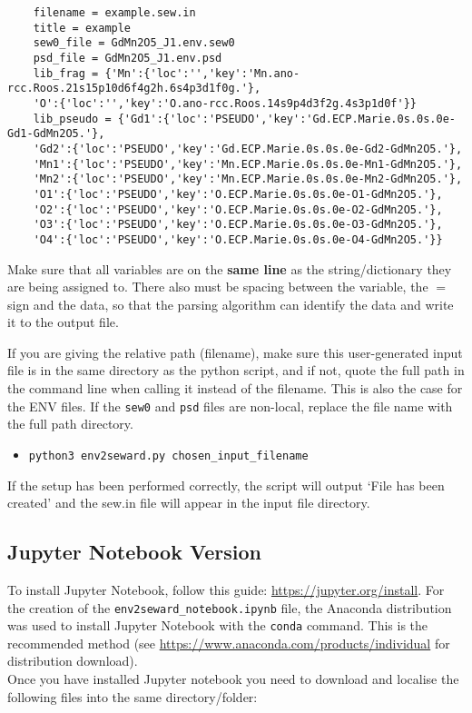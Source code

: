 \begin{lstlisting}
	filename = example.sew.in
	title = example
	sew0_file = GdMn2O5_J1.env.sew0
	psd_file = GdMn2O5_J1.env.psd
	lib_frag = {'Mn':{'loc':'','key':'Mn.ano-rcc.Roos.21s15p10d6f4g2h.6s4p3d1f0g.'},
	'O':{'loc':'','key':'O.ano-rcc.Roos.14s9p4d3f2g.4s3p1d0f'}}
	lib_pseudo = {'Gd1':{'loc':'PSEUDO','key':'Gd.ECP.Marie.0s.0s.0e-Gd1-GdMn2O5.'},
	'Gd2':{'loc':'PSEUDO','key':'Gd.ECP.Marie.0s.0s.0e-Gd2-GdMn2O5.'},
	'Mn1':{'loc':'PSEUDO','key':'Mn.ECP.Marie.0s.0s.0e-Mn1-GdMn2O5.'},
	'Mn2':{'loc':'PSEUDO','key':'Mn.ECP.Marie.0s.0s.0e-Mn2-GdMn2O5.'},
	'O1':{'loc':'PSEUDO','key':'O.ECP.Marie.0s.0s.0e-O1-GdMn2O5.'},
	'O2':{'loc':'PSEUDO','key':'O.ECP.Marie.0s.0s.0e-O2-GdMn2O5.'},
	'O3':{'loc':'PSEUDO','key':'O.ECP.Marie.0s.0s.0e-O3-GdMn2O5.'},
	'O4':{'loc':'PSEUDO','key':'O.ECP.Marie.0s.0s.0e-O4-GdMn2O5.'}}
\end{lstlisting}
Make sure that all variables are on the {\bf same line} as the string/dictionary they are being assigned to. There also must be spacing between the variable, the $=$ sign and the data, so that the parsing algorithm can identify the data and write it to the output file.

If you are giving the relative path (filename), make sure this user-generated input file is in the same directory as the python script, and if not, quote the full path in the command line when calling it instead of the filename. This is also the case for the ENV files. If the \texttt{sew0} and \texttt{psd} files are non-local, replace the file name with the full path directory.

\begin{itemize}
	\item \texttt{python3 env2seward.py chosen\_input\_filename}
\end{itemize}

If the setup has been performed correctly, the script will output `File has been created' and the sew.in file will appear in the input file directory.

\subsection{Jupyter Notebook Version}
To install Jupyter Notebook, follow this guide: \url{https://jupyter.org/install}. For the creation of the \texttt{env2seward\_notebook.ipynb} file, the Anaconda distribution was used to install Jupyter Notebook with the \texttt{conda} command. This is the recommended method (see \url{https://www.anaconda.com/products/individual} for distribution download). 
\\
Once you have installed Jupyter notebook you need to download and localise the following files into the same directory/folder:

